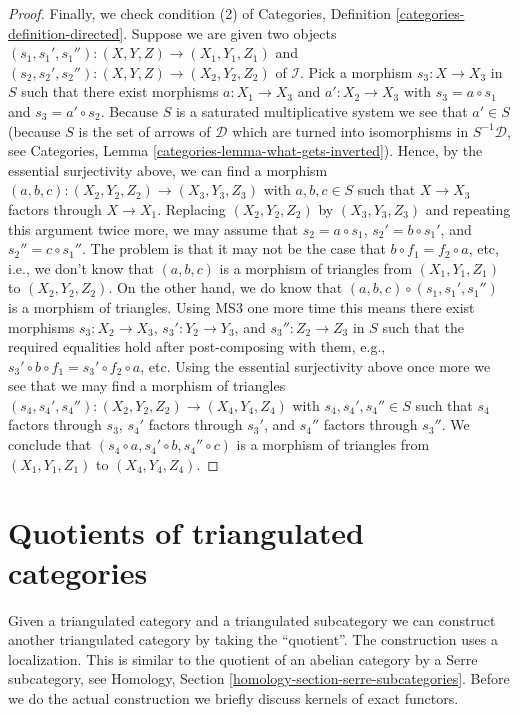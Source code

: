 \begin{proof}
\medskip\noindent
Finally, we check condition (2) of
Categories, Definition \ref{categories-definition-directed}.
Suppose we are given two objects
$(s_1, s_1', s_1'') : (X, Y, Z) \to (X_1, Y_1, Z_1)$ and
$(s_2, s_2', s_2'') : (X, Y, Z) \to (X_2, Y_2, Z_2)$
of $\mathcal{I}$. Pick a morphism $s_3 : X \to X_3$
in $S$ such that there exist morphisms $a : X_1 \to X_3$ and
$a' : X_2 \to X_3$ with $s_3 = a \circ s_1$ and $s_3 = a' \circ s_2$.
Because $S$ is a saturated multiplicative system we see that $a' \in S$
(because $S$ is the set of arrows of $\mathcal{D}$ which are turned into
isomorphisms in $S^{-1}\mathcal{D}$, see
Categories, Lemma \ref{categories-lemma-what-gets-inverted}).
Hence, by the essential surjectivity above, we can find a morphism
$(a, b, c) : (X_2, Y_2, Z_2) \to (X_3, Y_3, Z_3)$ with $a, b, c \in S$
such that $X \to X_3$ factors through $X \to X_1$. Replacing
$(X_2, Y_2, Z_2)$ by $(X_3, Y_3, Z_3)$ and repeating this argument
twice more, we may assume that $s_2 = a \circ s_1$, $s_2' = b \circ s_1'$,
and $s_2'' = c \circ s_1''$. The problem is that it may not be the case
that $b \circ f_1 = f_2 \circ a$, etc, i.e., we don't know that
$(a, b, c)$ is a morphism of triangles from $(X_1, Y_1, Z_1)$ to
$(X_2, Y_2, Z_2)$. On the other hand, we do know that
$(a, b, c) \circ (s_1, s_1', s_1'')$ is a morphism of triangles.
Using MS3 one more time this means there exist morphisms
$s_3 : X_2 \to X_3$, $s_3' : Y_2 \to Y_3$, and $s_3'' : Z_2 \to Z_3$
in $S$ such that the required equalities hold after post-composing
with them, e.g., $s_3' \circ b \circ f_1 = s_3' \circ f_2 \circ a$, etc.
Using the essential surjectivity above once more we see that we may find
a morphism of triangles
$(s_4, s_4', s_4'') : (X_2, Y_2, Z_2) \to (X_4, Y_4, Z_4)$
with $s_4, s_4', s_4'' \in S$ such that
$s_4$ factors through $s_3$,
$s_4'$ factors through $s_3'$, and
$s_4''$ factors through $s_3''$.
We conclude that $(s_4 \circ a, s_4' \circ b, s_4'' \circ c)$ is a
morphism of triangles from $(X_1, Y_1, Z_1)$ to $(X_4, Y_4, Z_4)$.
\end{proof}









\section{Quotients of triangulated categories}
\label{section-quotients}

\noindent
Given a triangulated category and a triangulated subcategory we can
construct another triangulated category by taking the ``quotient''.
The construction uses a localization. This is similar to the quotient
of an abelian category by a Serre subcategory, see
Homology, Section \ref{homology-section-serre-subcategories}.
Before we do the actual construction we briefly discuss kernels
of exact functors.

